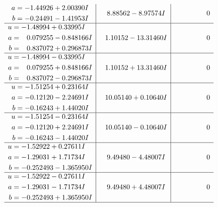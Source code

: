 \documentclass[1p]{elsarticle_modified}
\theoremstyle{definition}
\begin{document}
$$\begin{array}{c|c|c}
\begin{aligned}
a &= -1.44926 + 2.00390 I \\
b &= -0.24491 - 1.41953 I\end{aligned}
 & \phantom{-}8.88562 - 8.97574 I & \phantom{-0.000000 } 0 \\ \hline\begin{aligned}
u &= -1.48994 + 0.33995 I \\
a &= \phantom{-}0.079255 - 0.848166 I \\
b &= \phantom{-}0.837072 + 0.296873 I\end{aligned}
 & \phantom{-}1.10152 - 13.31460 I & \phantom{-0.000000 } 0 \\ \hline\begin{aligned}
u &= -1.48994 - 0.33995 I \\
a &= \phantom{-}0.079255 + 0.848166 I \\
b &= \phantom{-}0.837072 - 0.296873 I\end{aligned}
 & \phantom{-}1.10152 + 13.31460 I & \phantom{-0.000000 } 0 \\ \hline\begin{aligned}
u &= -1.51254 + 0.23164 I \\
a &= -0.12120 - 2.24691 I \\
b &= -0.16243 + 1.44020 I\end{aligned}
 & \phantom{-}10.05140 + 0.10640 I & \phantom{-0.000000 } 0 \\ \hline\begin{aligned}
u &= -1.51254 - 0.23164 I \\
a &= -0.12120 + 2.24691 I \\
b &= -0.16243 - 1.44020 I\end{aligned}
 & \phantom{-}10.05140 - 0.10640 I & \phantom{-0.000000 } 0 \\ \hline\begin{aligned}
u &= -1.52922 + 0.27611 I \\
a &= -1.29031 + 1.71734 I \\
b &= -0.252493 - 1.365950 I\end{aligned}
 & \phantom{-}9.49480 - 4.48007 I & \phantom{-0.000000 } 0 \\ \hline\begin{aligned}
u &= -1.52922 - 0.27611 I \\
a &= -1.29031 - 1.71734 I \\
b &= -0.252493 + 1.365950 I\end{aligned}
 & \phantom{-}9.49480 + 4.48007 I & \phantom{-0.000000 } 0\\
 \hline 

\end{array}$$
\end{document}
